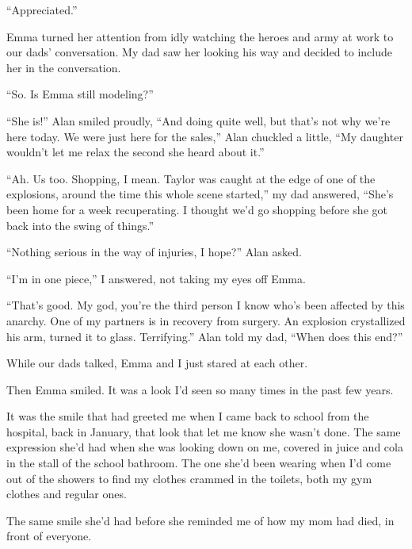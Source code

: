 ``Appreciated.''



Emma turned her attention from idly watching the heroes and army at work to our dads' conversation.  My dad saw her looking his way and decided to include her in the conversation.



``So.  Is Emma still modeling?''



``She is!'' Alan smiled proudly, ``And doing quite well, but that's not why we're here today.  We were just here for the sales,'' Alan chuckled a little, ``My daughter wouldn't let me relax the second she heard about it.''



``Ah.  Us too.  Shopping, I mean.  Taylor was caught at the edge of one of the explosions, around the time this whole scene started,'' my dad answered, ``She's been home for a week recuperating.  I thought we'd go shopping before she got back into the swing of things.''



``Nothing serious in the way of injuries, I hope?'' Alan asked.



``I'm in one piece,'' I answered, not taking my eyes off Emma.



``That's good.  My god, you're the third person I know who's been affected by this anarchy.  One of my partners is in recovery from surgery.  An explosion crystallized his arm, turned it to glass.  Terrifying.'' Alan told my dad, ``When does this end?''



While our dads talked, Emma and I just stared at each other.



Then Emma smiled.  It was a look I'd seen so many times in the past few years.



It was the smile that had greeted me when I came back to school from the hospital, back in January, that look that let me know she wasn't done.  The same expression she'd had when she was looking down on me, covered in juice and cola in the stall of the school bathroom.  The one she'd been wearing when I'd come out of the showers to find my clothes crammed in the toilets, both my gym clothes and regular ones.



The same smile she'd had before she reminded me of how my mom had died, in front of everyone.



